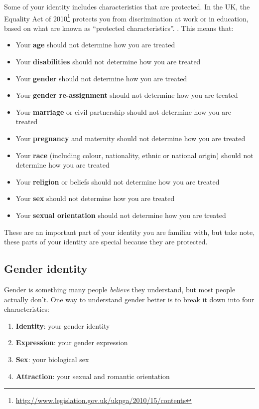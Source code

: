 \documentclass[
]{book}
\providecommand{\tightlist}{%
  \setlength{\itemsep}{0pt}\setlength{\parskip}{0pt}}
\begin{document}
Some of your identity includes characteristics that are protected. In the UK, the Equality Act of 2010\footnote{\url{http://www.legislation.gov.uk/ukpga/2010/15/contents}} protects you from discrimination at work or in education, based on what are known as ``protected characteristics''. \citep{equality}. This means that:

\begin{itemize}
\tightlist
\item
  Your \textbf{age} should not determine how you are treated
\item
  Your \textbf{disabilities} should not determine how you are treated
\item
  Your \textbf{gender} should not determine how you are treated \citep{inferior, damore, damoreguardian, everydaysexism}
\item
  Your \textbf{gender re-assignment} should not determine how you are treated
\item
  Your \textbf{marriage} or civil partnership should not determine how you are treated
\item
  Your \textbf{pregnancy} and maternity should not determine how you are treated
\item
  Your \textbf{race} (including colour, nationality, ethnic or national origin) should not determine how you are treated \citep{nottalking, superior}
\item
  Your \textbf{religion} or beliefs should not determine how you are treated
\item
  Your \textbf{sex} should not determine how you are treated \citep{harassment}
\item
  Your \textbf{sexual orientation} should not determine how you are treated \citep{nosex}
\end{itemize}

These are an important part of your identity you are familiar with, but take note, these parts of your identity are special because they are protected.

\hypertarget{genderid}{%
\subsection{Gender identity}\label{genderid}}

Gender is something many people \emph{believe} they understand, but most people actually don't. One way to understand gender better is to break it down into four characteristics:

\begin{enumerate}
\def\labelenumi{\arabic{enumi}.}
\tightlist
\item
  \textbf{Identity}: your gender identity
\item
  \textbf{Expression}: your gender expression
\item
  \textbf{Sex}: your biological sex
\item
  \textbf{Attraction}: your sexual and romantic orientation
\end{enumerate}
\end{document}
